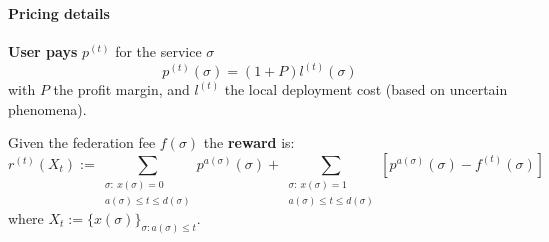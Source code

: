 \documentclass[aspectratio=169]{beamer}
\begin{document}
\begin{frame}
    \frametitle{\secname}
    \framesubtitle{Pricing details}

    \textbf{User pays} $p^{(t)}$ for the service $\sigma$
    \begin{equation}
        \mbox{$p^{(t)}(\sigma)=(1+P)l^{(t)}(\sigma)$}
        \label{eq:service-fee}
    \end{equation}
    with $P$ the profit margin, and $l^{(t)}$ the local deployment cost (based on uncertain phenomena).

    \vfill

    Given the federation fee $f(\sigma)$ the \textbf{reward} is:
    \begin{equation}
        r^{(t)}(X_t) := \!\!\!\!\!\!\!\!\!\!\sum_{\substack{\sigma:~ x(\sigma)=0\\a(\sigma) \le t\le d(\sigma)}} \!\!\!\!\!\!\!\! p^{a(\sigma)}(\sigma) +\!\!\!\!\!\!\!\!\!\! \sum_{\substack{\sigma:~ x(\sigma)=1\\ a(\sigma) \le t\le d(\sigma)}} \!\!\!\!\!\!\!\!\left[ p^{a(\sigma)}(\sigma) - f^{(t)}(\sigma) \right]
        \label{eq:instant-reward}
    \end{equation}
    where $X_t:=\{ x(\sigma) \}_{\sigma: a(\sigma)\le t}$.

\end{frame}
\end{document}
